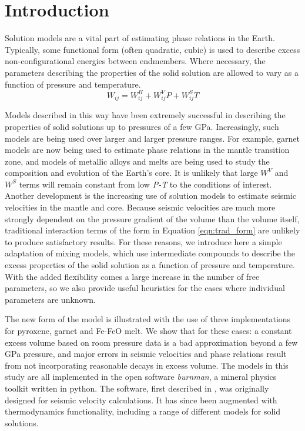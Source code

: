 \documentclass[review]{elsarticle}
\begin{document}
\linenumbers

\section{Introduction}

Solution models are a vital part of estimating phase relations in the Earth. Typically, some functional form (often quadratic, cubic) is used to describe excess non-configurational energies between endmembers. Where necessary, the parameters describing the properties of the solid solution are allowed to vary as a function of pressure and temperature. 
\begin{equation}
  W_{ij} = W_{ij}^H + W_{ij}^VP + W_{ij}^ST
  \label{eqn:trad_form}
\end{equation}

Models described in this way have been extremely successful in describing the properties of solid solutions up to pressures of a few GPa. Increasingly, such models are being used over larger and larger pressure ranges. For example, garnet models are now being used to estimate phase relations in the mantle transition zone, and models of metallic alloys and melts are being used to study the composition and evolution of the Earth's core. It is unlikely that large $W^V$ and $W^S$ terms will remain constant from low \emph{P-T} to the conditions of interest. Another development is the increasing use of solution models to estimate seismic velocities in the mantle and core. Because seismic velocities are much more strongly dependent on the pressure gradient of the volume than the volume itself, traditional interaction terms of the form in Equation \ref{eqn:trad_form} are unlikely to produce satisfactory results. For these reasons, we introduce here a simple adaptation of mixing models, which use intermediate compounds to describe the excess properties of the solid solution as a function of pressure and temperature. With the added flexibility comes a large increase in the number of free parameters, so we also provide useful heuristics for the cases where individual parameters are unknown.

The new form of the model is illustrated with the use of three implementations for pyroxene, garnet and Fe-FeO melt. We show that for these cases: a constant excess volume based on room pressure data is a bad approximation beyond a few GPa pressure, and major errors in seismic velocities and phase relations result from not incorporating reasonable decays in excess volume. The models in this study are all implemented in the open software \emph{burnman}, a mineral physics toolkit written in python. The software, first described in \cite{CHRU2014}, was originally designed for seismic velocity calculations. It has since been augmented with thermodynamics functionality, including a range of different models for solid solutions.
\end{document}
